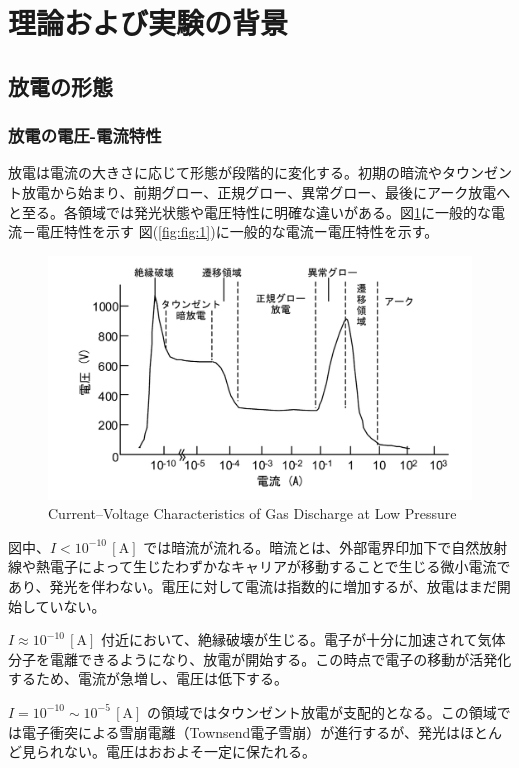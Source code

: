 \documentclass[dvipdfmx]{jsarticle}
\newcommand{\figlab}[1]{図(\ref{fig:#1})}%
\begin{document}
\section{理論および実験の背景}
\subsection{放電の形態}
\subsubsection*{放電の電圧-電流特性}
放電は電流の大きさに応じて形態が段階的に変化する。初期の暗流やタウンゼント放電から始まり、前期グロー、正規グロー、異常グロー、最後にアーク放電へと至る。各領域では発光状態や電圧特性に明確な違いがある。図\ref{fig:1}に一般的な電流－電圧特性を示す
 \figlab{fig:1}に一般的な電流ー電圧特性を示す。

 
 \begin{figure}[H]
 \centering
 \includegraphics[scale=0.4]{assets/IV-1.png}
 \caption{Current–Voltage Characteristics of Gas Discharge at Low Pressure}\label{fig:1}
 \end{figure}
図中、$I < 10^{-10}\,\mathrm{[A]}$ では暗流が流れる。暗流とは、外部電界印加下で自然放射線や熱電子によって生じたわずかなキャリアが移動することで生じる微小電流であり、発光を伴わない。電圧に対して電流は指数的に増加するが、放電はまだ開始していない。

$I \approx 10^{-10}\,\mathrm{[A]}$ 付近において、絶縁破壊が生じる。電子が十分に加速されて気体分子を電離できるようになり、放電が開始する。この時点で電子の移動が活発化するため、電流が急増し、電圧は低下する。

$I = 10^{-10} \sim 10^{-5}\,\mathrm{[A]}$ の領域ではタウンゼント放電が支配的となる。この領域では電子衝突による雪崩電離（Townsend電子雪崩）が進行するが、発光はほとんど見られない。電圧はおおよそ一定に保たれる。
\end{document}
